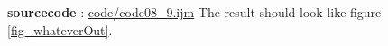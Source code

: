 \textbf{sourcecode} : \href{http://www.example.com/contents}{code/code08\_9.ijm}
The result should look like figure \ref{fig_whateverOut}.